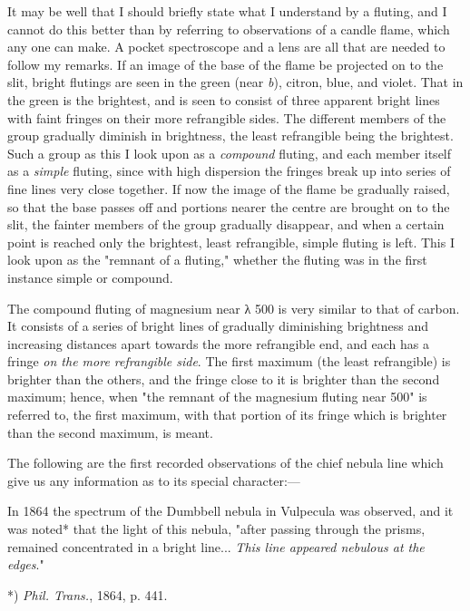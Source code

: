\documentclass[a4paper, 12pt, oneside, polutonikogreek, english]{article}
\begin{document}
It may be well that I should briefly state what I understand by a fluting, and I cannot do this better than by referring to observations of a candle flame, which any one can make. A pocket spectroscope and a lens are all that are needed to follow my remarks. If an image of the base of the flame be projected on to the slit, bright flutings are seen in the green (near \emph{b}), citron, blue, and violet. That in the green is the brightest, and is seen to consist of three apparent bright lines with faint fringes on their more refrangible sides. The different members of the group gradually diminish in brightness, the least refrangible being the brightest. Such a group as this I look upon as a \emph{compound} fluting, and each member itself as a \emph{simple} fluting, since with high dispersion the fringes break up into series of fine lines very close together. If now the image of the flame be gradually raised, so that the base passes off and portions nearer the centre are brought on to the slit, the fainter members of the group gradually disappear, and when a certain point is reached only the brightest, least refrangible, simple fluting is left. This I look upon as the "remnant of a fluting," whether the fluting was in the first instance simple or compound.

The compound fluting of magnesium near λ 500 is very similar to that of carbon. It consists of a series of bright lines of gradually diminishing brightness and increasing distances apart towards the more refrangible end, and each has a fringe \emph{on the more refrangible side}. The first maximum (the least refrangible) is brighter than the others, and the fringe close to it is brighter than the second maximum; hence, when "the remnant of the magnesium fluting near 500" is referred to, the first maximum, with that portion of its fringe which is brighter than the second maximum, is meant.

The following are the first recorded observations of the chief nebula line which give us any information as to its special character:---

In 1864 the spectrum of the Dumbbell nebula in Vulpecula was observed, and it was noted* that the light of this nebula, "after passing through the prisms, remained concentrated in a bright line... \emph{This line appeared nebulous at the edges}."

*) \emph{Phil. Trans.}, 1864, p. 441.
\end{document}
